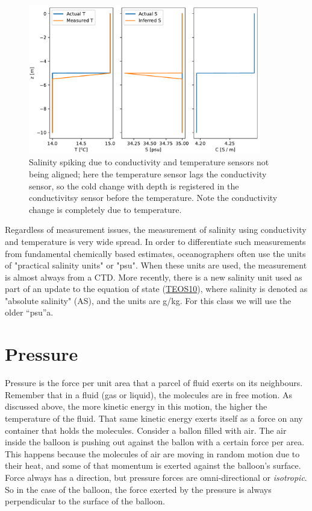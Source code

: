 \begin{figure}[hbt]
  \begin{center}
    \includegraphics[width=4in]{./figs/SalinitySpike.pdf}
    \caption{Salinity spiking due to conductivity and temperature sensors not being aligned; here the temperature sensor lags the conductivity sensor, so the cold change with depth is registered in the conductivitsy sensor before the temperature. Note the conductivity change is completely due to temperature.}
    \label{fig:SalinitySpike}
  \end{center}
\end{figure}

Regardless of measurement issues, the measurement of salinity using conductivity and temperature is very wide spread.  In order to differentiate such measurements from fundamental chemically based estimates, oceanographers often use the units of "practical salinity units" or "psu".  When these units are used, the measurement is almost always from a CTD.  More recently, there is a new salinity unit used as part of an update to the equation of state (\href{www.teos-10.org}{TEOS10}), where salinity is denoted as "absolute salinity" (AS), and the units are g/kg.  For this class we will use the older ``psu''a.   

\section{Pressure}
\label{sec:pressure}

Pressure is the force per unit area that a parcel of fluid exerts on its neighbours.  Remember that in a fluid (gas or liquid), the molecules are in free motion.  As discussed above, the more kinetic energy in this motion, the higher the temperature of the fluid.  That same kinetic energy exerts itself as a force on any container that holds the molecules. Consider a ballon filled with air.  The air inside the balloon is pushing out against the ballon with a certain force per area.  This happens because the molecules of air are moving in random motion due to their heat, and some of that momentum is exerted against the balloon's surface.  Force always has a direction, but pressure forces are omni-directional or \emph{isotropic}.  So in the case of the balloon, the force exerted by the pressure is always perpendicular to the surface of the balloon.

